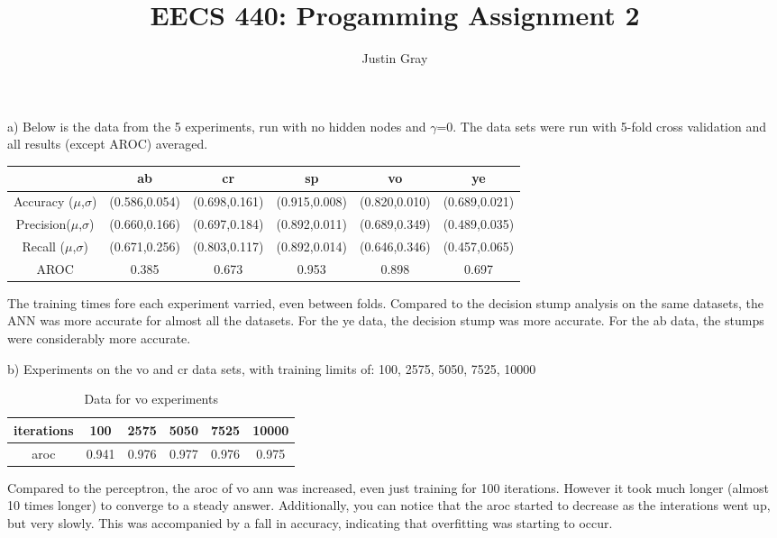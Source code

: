 \documentclass[12pt]{article}
\title{EECS 440: Progamming Assignment 2}
\author{Justin Gray}
\begin{document}
\maketitle

a) Below is the data from the 5 experiments, run with no hidden nodes and $\gamma$=0. The data sets were run with 
5-fold cross validation and all results (except AROC) averaged. 
\begin{table}[ht!]
    \begin{tabular}{|c|c|c|c|c|c|} \hline
                             & ab            & cr            & sp              & vo              & ye\\ \hline
    Accuracy ($\mu$,$\sigma$)& (0.586,0.054) & (0.698,0.161) & (0.915,0.008)   & (0.820,0.010)   &(0.689,0.021)\\ \hline
    Precision($\mu$,$\sigma$)& (0.660,0.166) & (0.697,0.184) & (0.892,0.011)   & (0.689,0.349)   &(0.489,0.035)\\ \hline
    Recall   ($\mu$,$\sigma$)& (0.671,0.256) & (0.803,0.117) & (0.892,0.014)   & (0.646,0.346)   &(0.457,0.065)\\ \hline  
    AROC                     &  0.385        &  0.673        & 0.953           & 0.898           & 0.697 \\
    \hline
    \end{tabular}
\end{table}

The training times fore each experiment varried, even between folds. Compared to the decision stump analysis on the same 
datasets, the ANN was more accurate for almost all the datasets. For the ye data, the decision stump was more accurate. For the 
ab data, the stumps were considerably more accurate. 

b) Experiments on the vo and cr data sets, with training limits of:  100,   2575,   5050,   7525,  10000

\begin{table}[ht!]
    \begin{tabular}{|c|c|c|c|c|c|} 
    \hline
    iterations & 100   & 2575  & 5050  & 7525  & 10000 \\ \hline
    aroc       & 0.941 & 0.976 & 0.977 & 0.976 & 0.975  \\
    \hline
    \end{tabular}
    \caption{Data for vo experiments}
\end{table}

Compared to the perceptron, the aroc of vo ann was increased, even just training for 100 iterations. 
However it took much longer (almost 10 times longer) to converge to a steady answer. Additionally, 
you can notice that the aroc started to decrease as the interations went up, but very slowly. This was 
accompanied by a fall in accuracy, indicating that overfitting was starting to occur.
\end{document}

